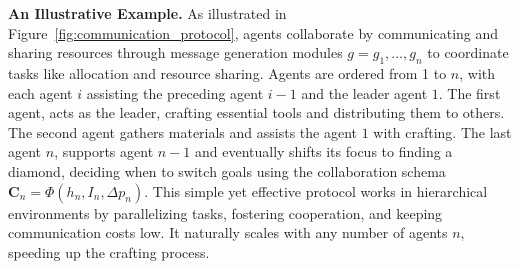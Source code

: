 

\textbf{An Illustrative Example.} As illustrated in Figure~\ref{fig:communication_protocol}, agents collaborate by communicating and sharing resources through message generation modules $g={g_1, \dots, g_n}$ to coordinate tasks like allocation and resource sharing. Agents are ordered from 1 to $n$, with each agent $i$ assisting the preceding agent $i-1$ and the leader agent $1$. The first agent, acts as the leader, crafting essential tools and distributing them to others. The second agent gathers materials and assists the agent $1$ with crafting. The last agent $n$, supports agent $n-1$ and eventually shifts its focus to finding a diamond, deciding when to switch goals using the collaboration schema $\boldsymbol{C}_n=\Phi(h_n, I_n, \Delta p_n)$. This simple yet effective protocol works in hierarchical environments by parallelizing tasks, fostering cooperation, and keeping communication costs low. It naturally scales with any number of agents $n$, speeding up the crafting process.

